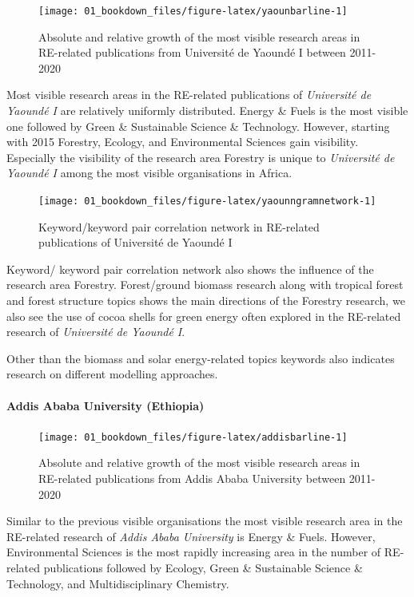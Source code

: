 \documentclass[
]{book}
\begin{document}
\begin{figure}
\texttt{[image: 01\_bookdown\_files/figure-latex/yaounbarline-1]} \caption{Absolute and relative growth of the most visible research areas in RE-related publications from Université de Yaoundé I between 2011-2020}\label{fig:yaounbarline}
\end{figure}

Most visible research areas in the RE-related publications of \emph{Université de Yaoundé I} are relatively uniformly distributed. Energy \& Fuels is the most visible one followed by Green \& Sustainable Science \& Technology. However, starting with 2015 Forestry, Ecology, and Environmental Sciences gain visibility. Especially the visibility of the research area Forestry is unique to \emph{Université de Yaoundé I} among the most visible organisations in Africa.

\begin{figure}
\texttt{[image: 01\_bookdown\_files/figure-latex/yaounngramnetwork-1]} \caption{Keyword/keyword pair correlation network in RE-related publications of Université de Yaoundé I}\label{fig:yaounngramnetwork}
\end{figure}

Keyword/ keyword pair correlation network also shows the influence of the research area Forestry. Forest/ground biomass research along with tropical forest and forest structure topics shows the main directions of the Forestry research, we also see the use of cocoa shells for green energy often explored in the RE-related research of \emph{Université de Yaoundé I}.

Other than the biomass and solar energy-related topics keywords also indicates research on different modelling approaches.

\hypertarget{addis-ababa-university-ethiopia}{%
\paragraph{Addis Ababa University (Ethiopia)}\label{addis-ababa-university-ethiopia}}

\begin{figure}
\texttt{[image: 01\_bookdown\_files/figure-latex/addisbarline-1]} \caption{Absolute and relative growth of the most visible research areas in RE-related publications from Addis Ababa University between 2011-2020}\label{fig:addisbarline}
\end{figure}

Similar to the previous visible organisations the most visible research area in the RE-related research of \emph{Addis Ababa University} is Energy \& Fuels. However, Environmental Sciences is the most rapidly increasing area in the number of RE-related publications followed by Ecology, Green \& Sustainable Science \& Technology, and Multidisciplinary Chemistry.
\end{document}
